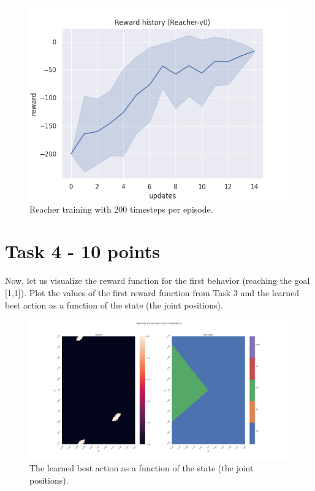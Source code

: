 \documentclass[12pt]{article}
\begin{document}
\begin{figure}[h] 
	\centering  %
    \includegraphics[width=0.8\columnwidth]{img/Figure_task3_1.png}
	\caption{Reacher training with 200 timesteps per episode.}
	\label{fig:fig31}
\end{figure}


\pagebreak
\section*{Task 4 - 10 points}

Now, let us visualize the reward function for the first behavior (reaching the goal [1,1]). Plot the values of the first reward function from Task 3 and the learned best action as a function of the state (the joint positions). 


\begin{figure}[h] 
	\centering  %
    \includegraphics[width=0.9\columnwidth]{img/Figure_task4.png}
	\caption{The learned best action as a function of the state (the joint positions).}
	\label{fig:fig4}
\end{figure}
\end{document}
